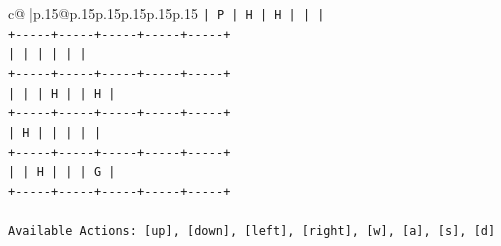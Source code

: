 \documentclass{article}
\begin{document}
{\begin{supertabular}{c@{$\;$}|p{.15\linewidth}@{}p{.15\linewidth}p{.15\linewidth}p{.15\linewidth}p{.15\linewidth}p{.15\linewidth}}
{{{\texttt{|  P  |  H  |  H  |     |     |} \\
\texttt{+{-}{-}{-}{-}{-}+{-}{-}{-}{-}{-}+{-}{-}{-}{-}{-}+{-}{-}{-}{-}{-}+{-}{-}{-}{-}{-}+} \\
\texttt{|     |     |     |     |     |} \\
\texttt{+{-}{-}{-}{-}{-}+{-}{-}{-}{-}{-}+{-}{-}{-}{-}{-}+{-}{-}{-}{-}{-}+{-}{-}{-}{-}{-}+} \\
\texttt{|     |     |  H  |     |  H  |} \\
\texttt{+{-}{-}{-}{-}{-}+{-}{-}{-}{-}{-}+{-}{-}{-}{-}{-}+{-}{-}{-}{-}{-}+{-}{-}{-}{-}{-}+} \\
\texttt{|  H  |     |     |     |     |} \\
\texttt{+{-}{-}{-}{-}{-}+{-}{-}{-}{-}{-}+{-}{-}{-}{-}{-}+{-}{-}{-}{-}{-}+{-}{-}{-}{-}{-}+} \\
\texttt{|     |  H  |     |     |  G  |} \\
\texttt{+{-}{-}{-}{-}{-}+{-}{-}{-}{-}{-}+{-}{-}{-}{-}{-}+{-}{-}{-}{-}{-}+{-}{-}{-}{-}{-}+} \\
\\ 
\texttt{Available Actions: {[}up{]}, {[}down{]}, {[}left{]}, {[}right{]}, {[}w{]}, {[}a{]}, {[}s{]}, {[}d{]}} \\
            }
        }
    }
     \\ \\


\end{supertabular}}
\end{document}
